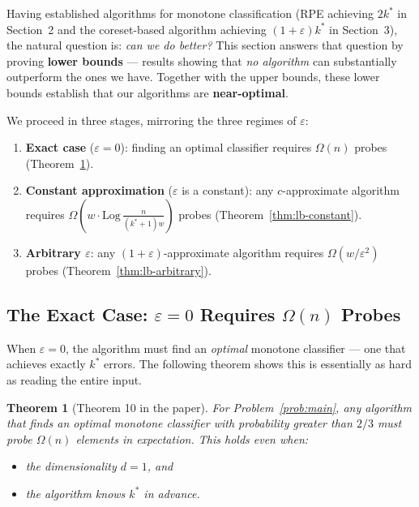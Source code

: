 \documentclass[11pt, a4paper]{article}
\theoremstyle{boxed}
\newtheorem{innertheorem}{Theorem}[section]
\newenvironment{theorem}
  {\begin{mdframed}[style=thmstyle]\begin{innertheorem}}
  {\end{innertheorem}\end{mdframed}}
\newcommand{\kstar}{k^{*}}
\begin{document}
Having established algorithms for monotone classification (RPE achieving $2\kstar$ in Section~2 and the coreset-based algorithm achieving $(1+\varepsilon)\kstar$ in Section~3), the natural question is: \emph{can we do better?} This section answers that question by proving \textbf{lower bounds} --- results showing that \emph{no algorithm} can substantially outperform the ones we have. Together with the upper bounds, these lower bounds establish that our algorithms are \textbf{near-optimal}.

We proceed in three stages, mirroring the three regimes of $\varepsilon$:
\begin{enumerate}
  \item \textbf{Exact case} ($\varepsilon = 0$): finding an optimal classifier requires $\Omega(n)$ probes (Theorem~\ref{thm:lb-exact}).
  \item \textbf{Constant approximation} ($\varepsilon$ is a constant): any $c$-approximate algorithm requires $\Omega(w \cdot \mathrm{Log}\,\frac{n}{(k^*+1)w})$ probes (Theorem~\ref{thm:lb-constant}).
  \item \textbf{Arbitrary $\varepsilon$}: any $(1+\varepsilon)$-approximate algorithm requires $\Omega(w/\varepsilon^2)$ probes (Theorem~\ref{thm:lb-arbitrary}).
\end{enumerate}

\subsection{The Exact Case: $\varepsilon = 0$ Requires $\Omega(n)$ Probes}

When $\varepsilon = 0$, the algorithm must find an \emph{optimal} monotone classifier --- one that achieves exactly $\kstar$ errors. The following theorem shows this is essentially as hard as reading the entire input.

\begin{theorem}[Theorem 10 in the paper]\label{thm:lb-exact}
  For Problem~\ref{prob:main}, any algorithm that finds an optimal monotone classifier with probability greater than $2/3$ must probe $\Omega(n)$ elements in expectation. This holds even when:
  \begin{itemize}
    \item the dimensionality $d = 1$, and
    \item the algorithm knows $\kstar$ in advance.
  \end{itemize}
\end{theorem}
\end{document}
